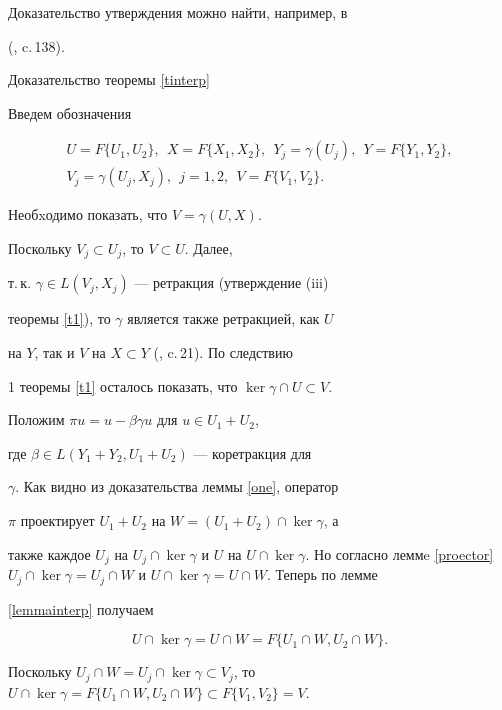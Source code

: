 Доказательство утверждения можно найти, например, в


(\cite{Trib}, c.\,138).





\begin{pf*}{Доказательство теоремы \ref{tinterp}}


Введем обозначения


\begin{gather*}


U=F\{U_1,U_2\},\ \ X=F\{X_1,X_2\},\ \ Y_j=\gamma(U_j),\ \


Y=F\{Y_1,Y_2\}, \\


V_j=\gamma(U_j,X_j),\ \ j=1,2,\ \ V=F\{V_1,V_2\}.


\end{gather*}


Необxодимо показать, что $V=\gamma(U,X)$.


Поскольку $V_j \subset U_j$, то $V \subset U$. Далее,


т.\,к. $\gamma \in L(V_j, X_j)$ --- ретракция (утверждение (iii)


теоремы \ref{t1}), то $\gamma$ является также ретракцией, как $U$


на $Y$, так и $V$ на $X \subset Y$ (\cite{Trib}, c.\,21). По следствию


1 теоремы \ref{t1} осталось показать, что $\ker \gamma \cap U


\subset V$.


Положим $\pi u=u - \beta\gamma u$ для $u \in U_1+U_2$,


где $\beta \in L(Y_1+Y_2, U_1+U_2)$ --- коретракция для


$\gamma$. Как видно из доказательства леммы \ref{one}, оператор


$\pi$ проектирует $U_1+U_2$ на $W=(U_1+U_2) \cap \ker \gamma$, а


также каждое $U_j$ на $U_j \cap \ker \gamma$ и $U$ на $U \cap \ker


\gamma$. Но согласно леммe \ref{proector} \ $U_j \cap \ker \gamma=U_j


\cap W$ и $U \cap \ker \gamma=U \cap W$. Теперь по лемме


\ref{lemmainterp} получаем


$$


U \cap \ker \gamma=U \cap W=F\{U_1 \cap W,U_2 \cap W\}.


$$


Поскольку $U_j \cap W=U_j \cap \ker \gamma \subset


V_j$, то $U \cap \ker \gamma=F\{U_1 \cap W, U_2 \cap W \}


\subset F\{V_1, V_2 \}=V$.


\end{pf*}





